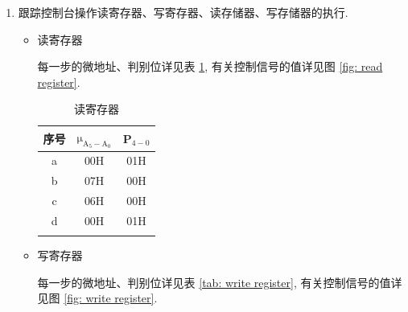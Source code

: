 \documentclass[../main.tex]{subfiles}
\begin{document}
\begin{enumerate}

    \item 跟踪控制台操作读寄存器、写寄存器、读存储器、写存储器的执行.

          \begin{itemize}

              \item 读寄存器

                    每一步的微地址、判别位详见表 \ref{tab: read register}, 有关控制信号的值详见图 \ref{fig: read register}.

                    \begin{table}[p]
                        \centering
                        \begin{tabular}{ccc}
                            \Xhline{1pt}
                            序号 & $\mathrm{\mu_{A_{5}-A_{0}}}$ & P$_{4-0}$ \\ \hline
                            a  & 00H                          & 01H       \\
                            b  & 07H                          & 00H       \\
                            c  & 06H                          & 00H       \\
                            d  & 00H                          & 01H       \\ \Xhline{1pt}
                        \end{tabular}
                        \caption{读寄存器}
                        \label{tab: read register}
                    \end{table}

              \item 写寄存器

                    每一步的微地址、判别位详见表 \ref{tab: write register}, 有关控制信号的值详见图 \ref{fig: write register}.


\end{itemize}
\end{enumerate}
\end{document}
